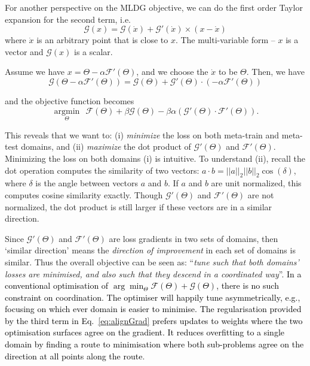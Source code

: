 \documentclass[letterpaper]{article} \usepackage{aaai18}  \usepackage{times}  \usepackage{helvet}  \usepackage{courier}  \usepackage{url}  \usepackage{graphicx}  \usepackage{amsmath}
\begin{document}
{For another perspective on the MLDG objective, we can do the first order Taylor expansion for the second term, i.e. 
\begin{equation}
\mathcal{G}(x)=\mathcal{G}(\dot{x})+\mathcal{G}'(\dot{x})\times(x-\dot{x})
\end{equation}
where $\dot{x}$ is an arbitrary point that is close to $x$. The multi-variable form – $x$ is a vector and $\mathcal{G}(x)$ is a scalar.

Assume we have $x=\Theta - \alpha \mathcal{F}'(\Theta)$, and we choose the $\dot{x}$ to be $\Theta$. Then, we have 
\begin{equation}
\mathcal{G}(\Theta - \alpha \mathcal{F}'(\Theta)) = \mathcal{G}(\Theta) + \mathcal{G}'(\Theta)\cdot(-\alpha \mathcal{F}'(\Theta))
\end{equation}

\noindent and the objective function becomes 
\begin{equation}
\underset{\Theta}{\operatorname{argmin}}~~ \mathcal{F}(\Theta) + \beta \mathcal{G}(\Theta) - \beta\alpha(\mathcal{G}'(\Theta)\cdot \mathcal{F}'(\Theta)).\label{eq:alignGrad}
\end{equation}



This reveals that we want to: (i) \textit{minimize} the loss on both meta-train and meta-test domains, and (ii) \textit{maximize} the dot product of $\mathcal{G}'(\Theta)$ and $\mathcal{F}'(\Theta)$. Minimizing the loss on both domains (i) is intuitive. To understand (ii), recall the dot operation computes the similarity of two vectors: $a\cdot b = ||a||_{2}||b||_{2}\cos (\delta)$, where $\delta$ is the angle between  vectors $a$ and $b$. If $a$ and $b$ are unit normalized, this computes cosine similarity exactly. Though $\mathcal{G}'(\Theta)$ and $\mathcal{F}'(\Theta)$ are not normalized, the dot product is still larger if these vectors are in a {similar direction}. 

Since $\mathcal{G}'(\Theta)$ and $\mathcal{F}'(\Theta)$ are loss gradients in two sets of domains, then `similar direction' means the \emph{direction of improvement} in each set of domains is similar. Thus the overall objective can be seen as: ``\emph{tune such that both domains' losses are minimised, and also such that they descend in a coordinated way}''. \textcolor{black}{In a conventional optimisation of $\arg\min_\Theta \mathcal{F}(\Theta)+\mathcal{G}(\Theta)$, there is no such constraint on coordination. The optimiser will happily tune asymmetrically, e.g., focusing on which ever domain is easier to minimise.} \textcolor{black}{The regularisation provided by the third term in  Eq.~\ref{eq:alignGrad}  prefers updates to weights where the two optimisation surfaces agree on the gradient. It reduces overfitting to a single domain by finding a route to minimisation where both sub-problems agree on the direction at all points along the route}.



}
\end{document}
